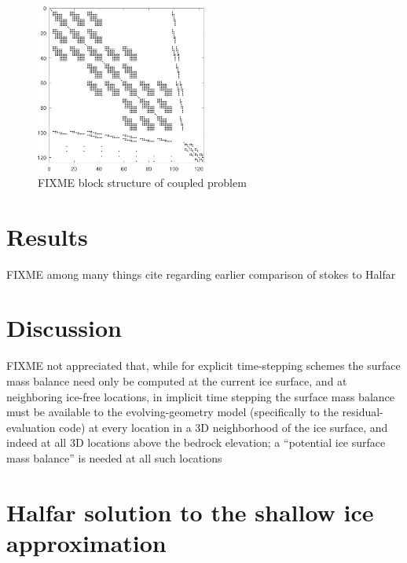 \documentclass[letterpaper,final,12pt,reqno]{amsart}
\begin{document}
\begin{figure}[ht]
\begin{center}
\includegraphics[width=0.5\textwidth]{figs/coarsespy.pdf}
\end{center}
\caption{FIXME block structure of coupled problem}
\label{fig:blockstructure}
\end{figure}

\section{Results}

FIXME among many things cite \cite{LeysingerGudmundsson2004} regarding earlier comparison of stokes to Halfar


\section{Discussion}

FIXME not appreciated that, while for explicit time-stepping schemes the surface mass balance need only be computed at the current ice surface, and at neighboring ice-free locations, in implicit time stepping the surface mass balance must be available to the evolving-geometry model (specifically to the residual-evaluation code) at every location in a 3D neighborhood of the ice surface, and indeed at all 3D locations above the bedrock elevation; a ``potential ice surface mass balance'' is needed at all such locations

\appendix
\section{Halfar solution to the shallow ice approximation}
\end{document}
